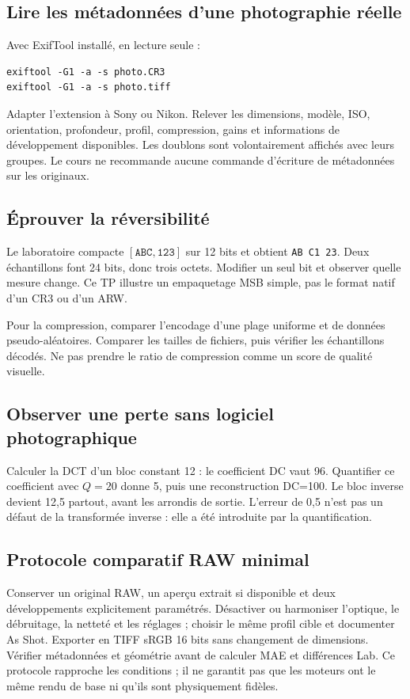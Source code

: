 \subsection{Lire les métadonnées d'une photographie réelle}
Avec ExifTool installé, en lecture seule :
\begin{verbatim}
exiftool -G1 -a -s photo.CR3
exiftool -G1 -a -s photo.tiff
\end{verbatim}
Adapter l'extension à Sony ou Nikon. Relever les
dimensions, modèle, ISO, orientation, profondeur,
profil, compression, gains et informations de
développement disponibles. Les doublons sont
volontairement affichés avec leurs groupes.
Le cours ne recommande aucune commande d'écriture
de métadonnées sur les originaux.

\subsection{Éprouver la réversibilité}
Le laboratoire compacte $[\texttt{ABC},\texttt{123}]$
sur 12 bits et obtient \texttt{AB C1 23}. Deux
échantillons font 24 bits, donc trois octets.
Modifier un seul bit et observer quelle mesure
change. Ce TP illustre un empaquetage MSB simple,
pas le format natif d'un CR3 ou d'un ARW.

Pour la compression, comparer l'encodage d'une
plage uniforme et de données pseudo-aléatoires.
Comparer les tailles de fichiers, puis vérifier
les échantillons décodés. Ne pas prendre le ratio
de compression comme un score de qualité visuelle.

\subsection{Observer une perte sans logiciel photographique}
Calculer la DCT d'un bloc constant 12 : le coefficient
DC vaut 96. Quantifier ce coefficient avec $Q=20$
donne 5, puis une reconstruction DC=100. Le bloc
inverse devient 12,5 partout, avant les arrondis
de sortie. L'erreur de 0,5 n'est pas un défaut
de la transformée inverse : elle a été introduite
par la quantification.

\subsection{Protocole comparatif RAW minimal}
Conserver un original RAW, un aperçu extrait si
disponible et deux développements explicitement
paramétrés. Désactiver ou harmoniser l'optique,
le débruitage, la netteté et les réglages ; choisir
le même profil cible et documenter As Shot.
Exporter en TIFF sRGB 16 bits sans changement
de dimensions. Vérifier métadonnées et géométrie
avant de calculer MAE et différences Lab.
Ce protocole rapproche les conditions ; il ne
garantit pas que les moteurs ont le même rendu
de base ni qu'ils sont physiquement fidèles.

